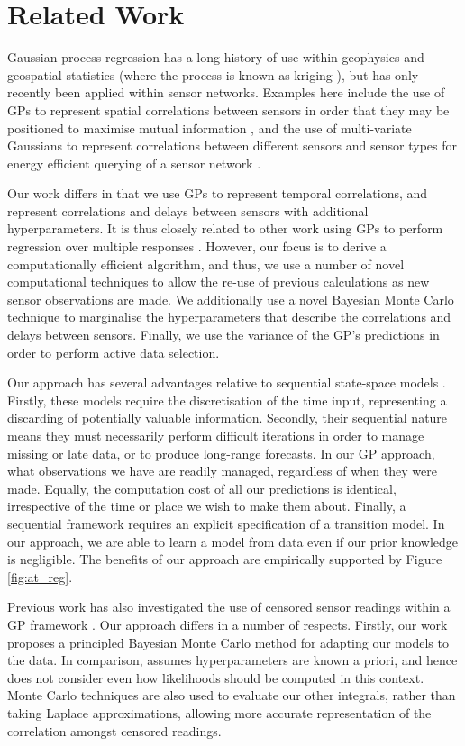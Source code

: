 \documentclass{acmtrans2m}
\begin{document}
\section{Related Work}\label{sec_related}

\noindent Gaussian process regression has a long history of use within geophysics and geospatial statistics (where the process is known as kriging \cite{cressie}), but has only recently been applied within sensor networks. Examples here include the use of GPs to represent spatial correlations between sensors in order that they may be positioned to maximise mutual information \cite{guestrin1}, and the use of multi-variate Gaussians to represent correlations between different sensors and sensor types for energy efficient querying of a sensor network \cite{guestrin2}. 

Our work differs in that we use GPs to represent temporal correlations, and represent correlations and delays between sensors with additional hyperparameters. It is thus closely related to other work using GPs to perform regression over multiple responses \cite{dep_GP,latent_factor}. However, our focus is to derive a computationally efficient algorithm, and thus, we use a number of novel computational techniques to allow the re-use of previous calculations as new sensor observations are made. We additionally use a novel Bayesian Monte Carlo technique to marginalise the hyperparameters that describe the correlations and delays between sensors. Finally, we use the variance of the GP's predictions in order to perform active data selection.

Our approach has several advantages relative to sequential state-space models \cite{Girard,Jazwinski}. Firstly, these models require the discretisation of the time input, representing a discarding of potentially valuable information. Secondly, their sequential nature means they must necessarily perform difficult iterations in order to manage missing or late data, or to produce long-range forecasts. In our GP approach, what observations we have are readily managed, regardless of when they were made. Equally, the computation cost of all our predictions is identical, irrespective of the time or place we wish to make them about. Finally, a sequential framework requires an explicit specification of a transition model. In our approach, we are able to learn a model from data even if our prior knowledge is negligible. The benefits of our approach are empirically supported by Figure \ref{fig:at_reg}.

Previous work has also investigated the use of censored sensor readings within a GP framework \cite{ertin2007gpm}. Our approach differs in a number of respects. Firstly, our work proposes a principled Bayesian Monte Carlo method for adapting our models to the data. In comparison, \cite{ertin2007gpm} assumes hyperparameters are known a priori, and hence does not consider even how likelihoods should be computed in this context. Monte Carlo techniques are also used to evaluate our other integrals, rather than taking Laplace approximations, allowing more accurate representation of the correlation amongst censored readings. 
\end{document}

